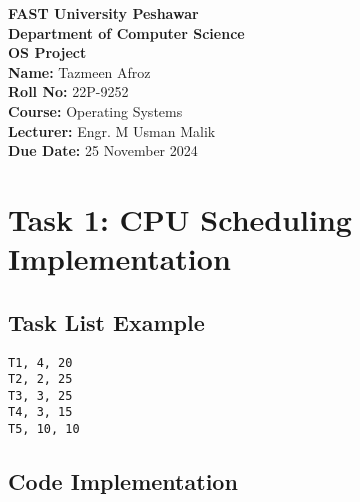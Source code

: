 \documentclass{article}
\begin{document}
\begin{center}
    \textbf{FAST University Peshawar}\\
    \textbf{Department of Computer Science}\\
    \Large{\textbf{OS Project}}\\
    \vspace{0.5cm}
      \textbf{Name:} Tazmeen Afroz\\
        \textbf{Roll No:} 22P-9252\\
    \textbf{Course:} Operating Systems\\
    \textbf{Lecturer:} Engr. M Usman Malik\\
    \textbf{Due Date:} 25 November 2024\\
  
\end{center}



\section*{Task 1: CPU Scheduling Implementation}


\subsection*{Task List Example}

\begin{verbatim}
T1, 4, 20
T2, 2, 25
T3, 3, 25
T4, 3, 15
T5, 10, 10
\end{verbatim}

\subsection*{Code Implementation}
\end{document}
